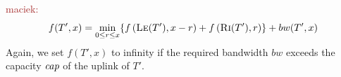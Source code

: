 \documentclass[9pt]{sigcomm-alternate}
\newcommand{\maciek}[1]{\textcolor{brown}{maciek: #1}}
\newcommand{\capacity}{\emph{cap}}
\begin{document}
\maciek{$$f(T',x) =   \min_{0\leq r \leq x} \{  f\left(\textsc{Le}(T'), x-r\right) +
f\left(\textsc{Ri}(T'), r\right) \} + bw(T',x)$$}
Again, we set $f(T',x)$ to infinity if the required bandwidth
$bw$ exceeds the capacity $\capacity$ of the uplink of $T'$.
  



%
\end{document}

